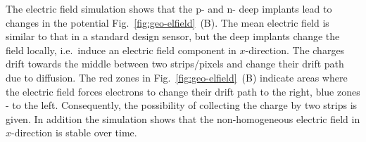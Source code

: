 The electric field simulation shows that the p- and n- deep implants lead to changes in the potential Fig.~\ref{fig:geo-elfield}~(B). %
The mean electric field is similar to that in a standard design sensor, but the deep implants change the field locally, i.e.\ induce an electric field component in $x$-direction. %
The charges drift towards the middle between two strips/pixels and change their drift path due to diffusion. %
The red zones in Fig.~\ref{fig:geo-elfield}~(B) indicate areas where the electric field forces electrons to change their drift path to the right, blue zones - to the left.
Consequently, the possibility of collecting the charge by two strips is given. 
In addition the simulation shows that the non-homogeneous electric field in $x$-direction is stable over time. 



